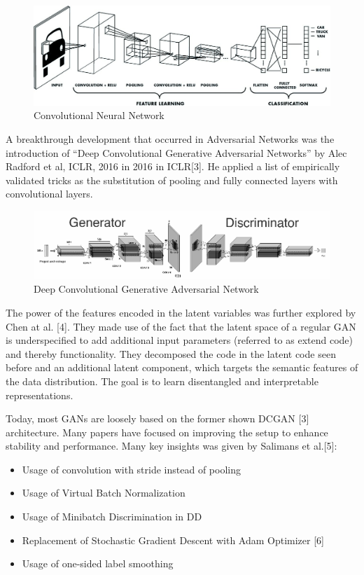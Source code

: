 \begin{figure}[H]
\centering\includegraphics[width=.7\textwidth]{images/CNN.jpg}
\caption{Convolutional Neural Network}
\end{figure}
A breakthrough development that occurred in Adversarial Networks was the introduction of “Deep Convolutional Generative Adversarial Networks” by Alec Radford et al, ICLR, 2016 in 2016 in ICLR[3]. He applied a list of empirically validated tricks as the substitution of pooling and fully connected layers with convolutional layers.\par\bigskip
\begin{figure}[H]
\centering\includegraphics[width=1\textwidth]{images/dcgan.png}
\caption{Deep Convolutional Generative Adversarial Network}
\end{figure}
The power of the features encoded in the latent variables was further explored by Chen at al. [4]. They made use of the fact that the latent space of a regular GAN is underspecified to add additional input parameters (referred to as extend code) and thereby functionality. They decomposed the code in the latent code seen before and an additional latent component, which targets the semantic features of the data distribution. The goal is to learn disentangled and interpretable representations.\par\bigskip
Today, most GANs are loosely based on the former shown DCGAN [3] architecture. Many papers have focused on improving the setup to enhance stability and performance. Many key insights was given by Salimans et al.[5]:
\begin{itemize}
\item Usage of convolution with stride instead of pooling
\item Usage of Virtual Batch Normalization
\item Usage of Minibatch Discrimination in DD
\item Replacement of Stochastic Gradient Descent with Adam Optimizer [6]
\item Usage of one-sided label smoothing
\end{itemize}
